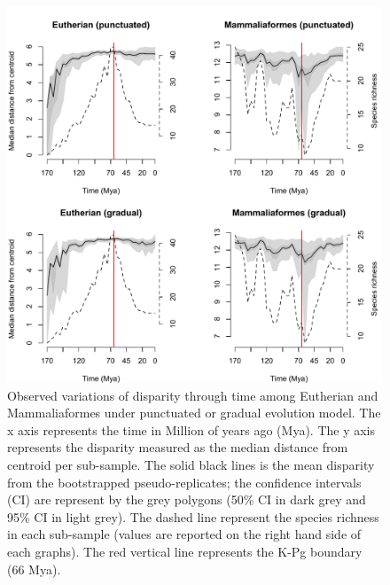 \documentclass[12pt,letterpaper]{article}
\begin{document}
\begin{figure}[!htbp]
\centering
    \includegraphics[keepaspectratio=true]{Figures/Main_results.pdf}
\caption{Observed variations of disparity through time among Eutherian and Mammaliaformes under punctuated or gradual evolution model. The x axis represents the time in Million of years ago (Mya). The y axis represents the disparity measured as the median distance from centroid per sub-sample. The solid black lines is the mean disparity from the bootstrapped pseudo-replicates; the confidence intervals (CI) are represent by the grey polygons (50\% CI in dark grey and 95\% CI in light grey). The dashed line represent the species richness in each sub-sample (values are reported on the right hand side of each graphs). The red vertical line represents the K-Pg boundary (66 Mya).}
\label{fig:Fig_Raw_results}
\end{figure}
\end{document}
